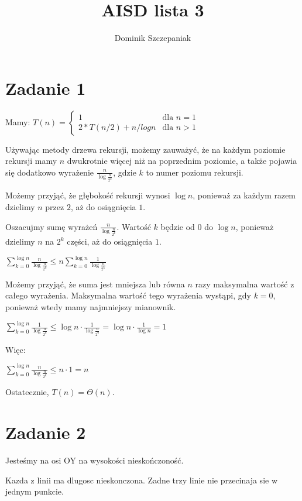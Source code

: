 \documentclass[12pt]{article}
\title{AISD lista 3}
\author{Dominik Szczepaniak}
\begin{document}
\maketitle

\bgroup\obeylines



\section{Zadanie 1}
Mamy:
$T(n) = \begin{cases}
    1 & \text{dla } n = 1\\
    2*T(n/2) + n / logn & \text{dla } n > 1
\end{cases}$


Używając metody drzewa rekursji, możemy zauważyć, że na każdym poziomie rekursji mamy $n$ dwukrotnie więcej niż na poprzednim poziomie, a także pojawia się dodatkowo wyrażenie $\frac{n}{\log\frac{n}{2^k}}$, gdzie $k$ to numer poziomu rekursji.

Możemy przyjąć, że głębokość rekursji wynosi $\log n$, ponieważ za każdym razem dzielimy $n$ przez $2$, aż do osiągnięcia $1$.

Oszacujmy sumę wyrażeń $\frac{n}{\log\frac{n}{2^k}}$. Wartość $k$ będzie od $0$ do $\log n$, ponieważ dzielimy $n$ na $2^k$ części, aż do osiągnięcia $1$.


$\sum_{k=0}^{\log n} \frac{n}{\log\frac{n}{2^k}} \leq n \sum_{k=0}^{\log n} \frac{1}{\log\frac{n}{2^k}}$


Możemy przyjąć, że suma jest mniejsza lub równa $n$ razy maksymalna wartość z całego wyrażenia. Maksymalna wartość tego wyrażenia wystąpi, gdy $k = 0$, ponieważ wtedy mamy najmniejszy mianownik.


$\sum_{k=0}^{\log n} \frac{1}{\log\frac{n}{2^k}} \leq \log n \cdot \frac{1}{\log\frac{n}{2^0}} = \log n \cdot \frac{1}{\log n} = 1$


Więc:


$\sum_{k=0}^{\log n} \frac{n}{\log\frac{n}{2^k}} \leq n \cdot 1 = n$

Ostatecznie, $T(n) = \Theta(n)$.



\section{Zadanie 2}
Jesteśmy na osi OY na wysokości nieskończoność.

Kazda z linii ma dlugosc nieskonczona.
Zadne trzy linie nie przecinaja sie w jednym punkcie. 
\end{document}

